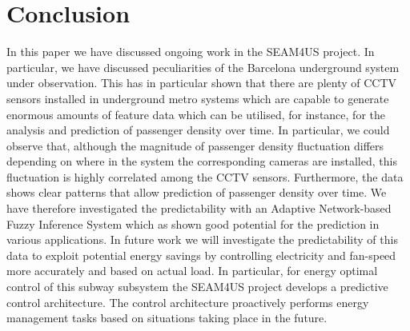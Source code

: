 \section{Conclusion}
\label{sec:conclusion}
In this paper we have discussed ongoing work in the SEAM4US project. 
In particular, we have discussed peculiarities of the Barcelona underground system under observation.
This has in particular shown that there are plenty of CCTV sensors installed in underground metro systems which are capable to generate enormous amounts of feature data which can be utilised, for instance, for the analysis and prediction of passenger density over time.
In particular, we could observe that, although the magnitude of passenger density fluctuation differs depending on where in the system the corresponding cameras are installed, this fluctuation is highly correlated among the CCTV sensors.
Furthermore, the data shows clear patterns that allow prediction of passenger density over time. 
We have therefore investigated the predictability with an Adaptive Network-based Fuzzy Inference System which as shown good potential for the prediction in various applications. 
In future work we will investigate the predictability of this data to exploit potential energy savings by controlling electricity and fan-speed more accurately and based on actual load.  
In particular, for energy optimal control of this subway subsystem the SEAM4US project develops a predictive control architecture. 
The control architecture proactively performs energy management tasks based on situations taking place in the future. 
